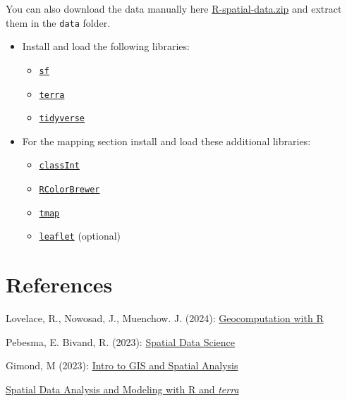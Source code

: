 \documentclass[
]{book}
\providecommand{\tightlist}{%
  \setlength{\itemsep}{0pt}\setlength{\parskip}{0pt}}
\begin{document}
You can also download the data manually here \href{https://github.com/cengel/R-spatial/raw/master/data/R-spatial-data.zip}{R-spatial-data.zip} and extract them in the \texttt{data} folder.

\begin{itemize}
\tightlist
\item
  Install and load the following libraries:

  \begin{itemize}
  \tightlist
  \item
    \href{https://cran.r-project.org/package=sf}{\texttt{sf}}
  \item
    \href{https://cran.r-project.org/package=terra}{\texttt{terra}}
  \item
    \href{https://cran.r-project.org/package=tidyverse}{\texttt{tidyverse}}
  \end{itemize}
\item
  For the mapping section install and load these additional libraries:

  \begin{itemize}
  \tightlist
  \item
    \href{https://cran.r-project.org/package=classInt}{\texttt{classInt}}
  \item
    \href{https://cran.r-project.org/package=RColorBrewer}{\texttt{RColorBrewer}}
  \item
    \href{https://cran.r-project.org/package=tmap}{\texttt{tmap}}
  \item
    \href{https://cran.r-project.org/package=leaflet}{\texttt{leaflet}} (optional)
  \end{itemize}
\end{itemize}

\section*{References}\label{references}

Lovelace, R., Nowosad, J., Muenchow. J. (2024): \href{https://r.geocompx.org/}{Geocomputation with R}

Pebesma, E. Bivand, R. (2023): \href{https://r-spatial.org/book/}{Spatial Data Science}

Gimond, M (2023): \href{https://mgimond.github.io/Spatial/index.html}{Intro to GIS and Spatial Analysis}

\href{http://www.rspatial.org/index.html}{Spatial Data Analysis and Modeling with R and \emph{terra}}
\end{document}
